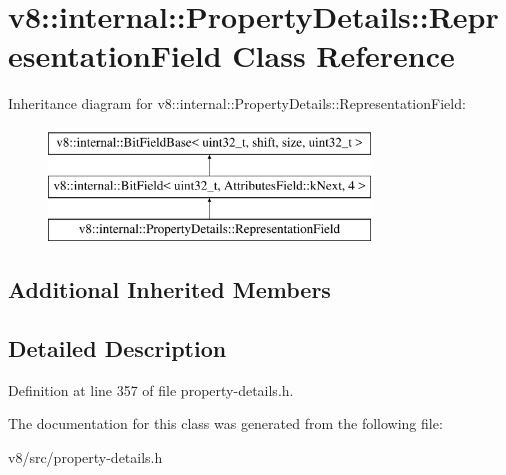 \hypertarget{classv8_1_1internal_1_1PropertyDetails_1_1RepresentationField}{}\section{v8\+:\+:internal\+:\+:Property\+Details\+:\+:Representation\+Field Class Reference}
\label{classv8_1_1internal_1_1PropertyDetails_1_1RepresentationField}
Inheritance diagram for v8\+:\+:internal\+:\+:Property\+Details\+:\+:Representation\+Field\+:\begin{figure}[H]
\begin{center}
\leavevmode
\includegraphics[height=3.000000cm]{classv8_1_1internal_1_1PropertyDetails_1_1RepresentationField}
\end{center}
\end{figure}
\subsection*{Additional Inherited Members}


\subsection{Detailed Description}


Definition at line 357 of file property-\/details.\+h.



The documentation for this class was generated from the following file\+:\begin{DoxyCompactItemize}
\item 
v8/src/property-\/details.\+h\end{DoxyCompactItemize}
